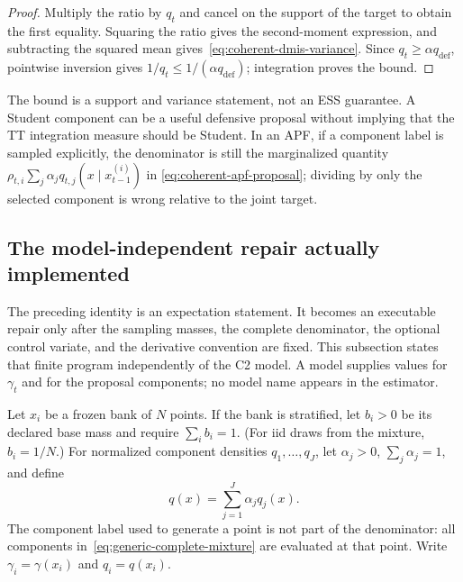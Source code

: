 \documentclass[11pt]{article}
\begin{document}
\begin{proof}
Multiply the ratio by $q_t$ and cancel on the support of the target to obtain
the first equality. Squaring the ratio gives the second-moment expression, and
subtracting the squared mean gives~\eqref{eq:coherent-dmis-variance}. Since
$q_t\geq\alpha q_{\mathrm{def}}$, pointwise inversion gives
$1/q_t\leq1/(\alpha q_{\mathrm{def}})$; integration proves the bound.
\end{proof}

The bound is a support and variance statement, not an ESS guarantee. A
Student component can be a useful defensive proposal without implying that the
TT integration measure should be Student. In an APF, if a component label is
sampled explicitly, the denominator is still the marginalized quantity
$\rho_{t,i}\sum_j\alpha_jq_{t,j}(x\mid x_{t-1}^{(i)})$ in
\eqref{eq:coherent-apf-proposal}; dividing by only the selected component is
wrong relative to the joint target.

\subsection{The model-independent repair actually implemented}
\label{sec:generic-repair}

The preceding identity is an expectation statement. It becomes an executable
repair only after the sampling masses, the complete denominator, the optional
control variate, and the derivative convention are fixed. This subsection
states that finite program independently of the C2 model. A model supplies
values for $\gamma_t$ and for the proposal components; no model name appears in
the estimator.

Let $x_i$ be a frozen bank of $N$ points. If the bank is stratified, let
$b_i>0$ be its declared base mass and require $\sum_i b_i=1$. (For iid draws
from the mixture, $b_i=1/N$.) For normalized component densities
$q_1,\ldots,q_J$, let $\alpha_j>0$, $\sum_j\alpha_j=1$, and define
\begin{equation}\label{eq:generic-complete-mixture}
  q(x)=\sum_{j=1}^J\alpha_jq_j(x).
\end{equation}
The component label used to generate a point is not part of the denominator:
all components in~\eqref{eq:generic-complete-mixture} are evaluated at that
point. Write $\gamma_i=\gamma(x_i)$ and $q_i=q(x_i)$.
\end{document}
